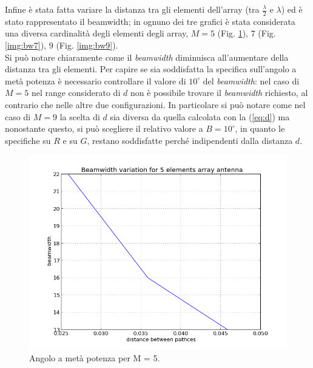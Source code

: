 Infine è stata fatta variare la distanza tra gli elementi dell'array (tra $\frac{\lambda}{2}$ e $\lambda$) ed è stato rappresentato il beamwidth; in ognuno dei tre grafici è stata considerata una diversa cardinalità degli elementi degli array, $M = 5$ (Fig. \ref{img:bw5}), $7$ (Fig. \ref{img:bw7}), $9$ (Fig. \ref{img:bw9}). \\
Si può notare chiaramente come il \emph{beamwidth} diminuisca all'aumentare della distanza tra gli elementi. Per capire se sia soddisfatta la specifica sull'angolo a metà potenza è necessario controllare il valore di $10^\circ$ del \emph{beamwidth}: nel caso di $M = 5$ nel range considerato di $d$ non è possibile trovare il \emph{beamwidth} richiesto, al contrario che nelle altre due configurazioni. In particolare si può notare come nel caso di $M = 9$ la scelta di $d$ sia diversa da quella calcolata con la (\ref{eq:d}) ma nonostante questo, si può scegliere il relativo valore a $B = 10^\circ$, in quanto le specifiche su $R$ e su $G$, restano soddisfatte perché indipendenti dalla distanza $d$. \\[1cm]
\begin{figure}
\centering
\caption{Angolo a metà potenza per M = 5.}
\label{img:bw5}
\includegraphics[scale=0.5]{Immagini/bw5}
\end{figure}
